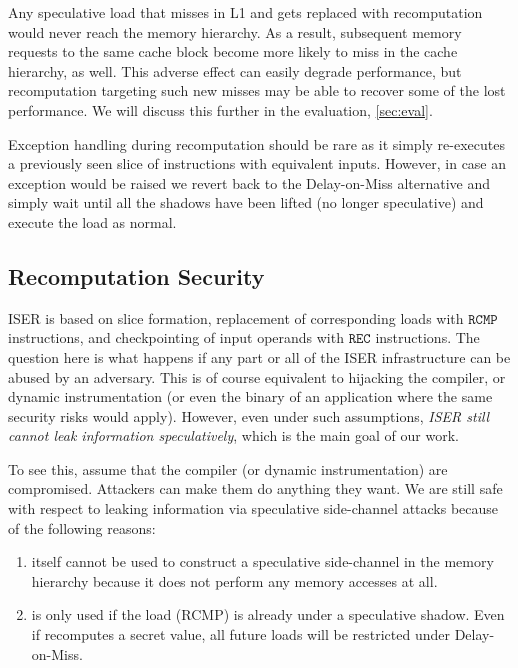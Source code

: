 Any speculative load that misses in L1 and gets replaced with recomputation would never reach the memory hierarchy. As a result, subsequent memory requests to the same cache block become more likely to miss in the cache hierarchy, as well. This adverse effect can easily degrade performance, but recomputation targeting such new misses may be able to recover some of the lost performance. 
We will discuss this further in the evaluation, \autoref{sec:eval}.
 
Exception handling during recomputation should be rare as it simply re-executes a previously seen slice of instructions with equivalent inputs. However, in case an exception would be raised we revert back to the Delay-on-Miss alternative and simply wait until all the shadows have been lifted (no longer speculative) and execute the load as normal.



\subsection{Recomputation Security}
\label{sec:recmp-sec}

ISER is based on slice formation, replacement of corresponding loads with $\texttt{RCMP}$ instructions, and checkpointing of input operands with $\texttt{REC}$ instructions. The question here is what happens if any part or all of the ISER infrastructure can be abused by an adversary. This is of course equivalent to hijacking the compiler, or dynamic instrumentation (or even the binary of an application where the same security risks would apply).
However, even under such assumptions, \emph{ISER still cannot leak information speculatively}, which is the main goal of our work.

To see this, assume that the compiler (or dynamic instrumentation) are compromised. Attackers can make them do anything they want. We are still safe with respect to leaking information via speculative side-channel attacks because of the following reasons:

\begin{enumerate}

    \item {\recomp} itself cannot be used to construct a speculative side-channel in the memory hierarchy because it does not perform any memory accesses at all.
    
    \item {\recomp} is only used if the load (RCMP) is already under a speculative shadow. Even if {\recomp} recomputes a secret value, all future loads will be restricted under Delay-on-Miss.
    
\end{enumerate}

